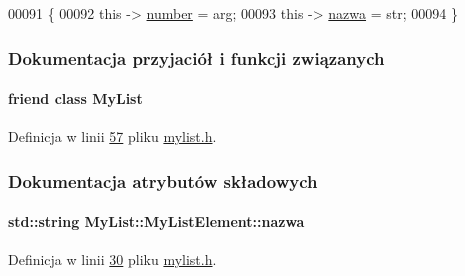 \begin{DoxyCode}
00091                                                    \{
00092         \textcolor{keyword}{this} -> \hyperlink{class_my_list_1_1_my_list_element_acd6dbb6a8791f034f94678d46395b366}{number} = arg;
00093         \textcolor{keyword}{this} -> \hyperlink{class_my_list_1_1_my_list_element_af610aeae835150be1a12d538e67a579c}{nazwa} = str;
00094 \}
\end{DoxyCode}


\subsubsection{Dokumentacja przyjaciół i funkcji związanych}
\hypertarget{class_my_list_1_1_my_list_element_a3aca1c680e3cc534773a005bb24bfed4}{
\paragraph[{My\-List}]{\setlength{\rightskip}{0pt plus 5cm}friend class {\bf My\-List}\hspace{0.3cm}{\ttfamily [friend]}}}\label{class_my_list_1_1_my_list_element_a3aca1c680e3cc534773a005bb24bfed4}


Definicja w linii \hyperlink{mylist_8h_source_l00057}{57} pliku \hyperlink{mylist_8h_source}{mylist.\-h}.



\subsubsection{Dokumentacja atrybutów składowych}
\hypertarget{class_my_list_1_1_my_list_element_af610aeae835150be1a12d538e67a579c}{
\paragraph[{nazwa}]{\setlength{\rightskip}{0pt plus 5cm}std\-::string My\-List\-::\-My\-List\-Element\-::nazwa}}\label{class_my_list_1_1_my_list_element_af610aeae835150be1a12d538e67a579c}


Definicja w linii \hyperlink{mylist_8h_source_l00030}{30} pliku \hyperlink{mylist_8h_source}{mylist.\-h}.



